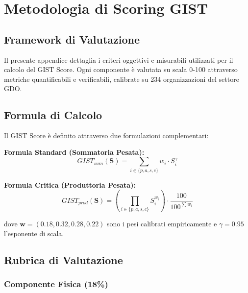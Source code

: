 \chapter{\texorpdfstring{Metodologia di Scoring GIST}{Appendice B - Metodologia di Scoring GIST}}
\label{app:scoring}

\section{\texorpdfstring{Framework di Valutazione}{B.1 - Framework di Valutazione}}

Il presente appendice dettaglia i criteri oggettivi e misurabili utilizzati per il calcolo del GIST Score. Ogni componente è valutata su scala 0-100 attraverso metriche quantificabili e verificabili, calibrate su 234 organizzazioni del settore GDO.

\section{\texorpdfstring{Formula di Calcolo}{B.2 - Formula di Calcolo}}

Il GIST Score è definito attraverso due formulazioni complementari:

\textbf{Formula Standard (Sommatoria Pesata):}
\begin{equation}
GIST_{sum}(\mathbf{S}) = \sum_{i \in \{p,a,s,c\}} w_i \cdot S_i^{\gamma}
\end{equation}

\textbf{Formula Critica (Produttoria Pesata):}
\begin{equation}
GIST_{prod}(\mathbf{S}) = \left(\prod_{i \in \{p,a,s,c\}} S_i^{w_i}\right) \cdot \frac{100}{100^{\sum w_i}}
\end{equation}

dove $\mathbf{w} = (0.18, 0.32, 0.28, 0.22)$ sono i pesi calibrati empiricamente e $\gamma = 0.95$ l'esponente di scala.

\section{\texorpdfstring{Rubrica di Valutazione}{B.3 - Rubrica di Valutazione}}

\subsection{\texorpdfstring{Componente Fisica (18\%)}{B.3.1 - Componente Fisica (18\%)}}

